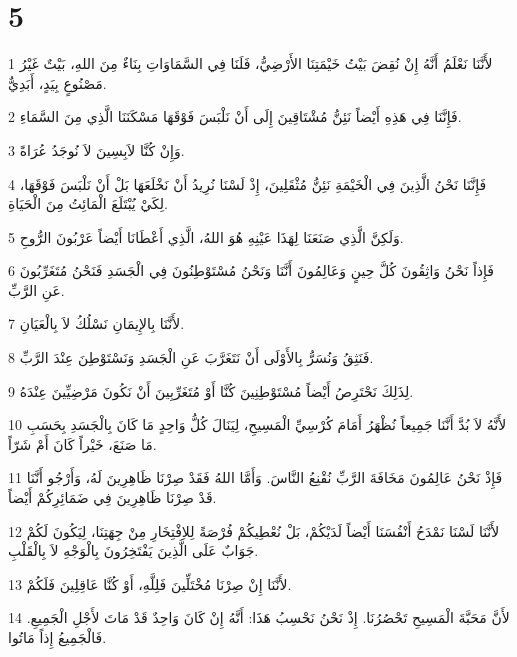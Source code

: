 \chapter{5}

\par 1 لأَنَّنَا نَعْلَمُ أَنَّهُ إِنْ نُقِضَ بَيْتُ خَيْمَتِنَا الأَرْضِيُّ، فَلَنَا فِي السَّمَاوَاتِ بِنَاءٌ مِنَ اللهِ، بَيْتٌ غَيْرُ مَصْنُوعٍ بِيَدٍ، أَبَدِيٌّ.
\par 2 فَإِنَّنَا فِي هَذِهِ أَيْضاً نَئِنُّ مُشْتَاقِينَ إِلَى أَنْ نَلْبَسَ فَوْقَهَا مَسْكَنَنَا الَّذِي مِنَ السَّمَاءِ.
\par 3 وَإِنْ كُنَّا لاَبِسِينَ لاَ نُوجَدُ عُرَاةً.
\par 4 فَإِنَّنَا نَحْنُ الَّذِينَ فِي الْخَيْمَةِ نَئِنُّ مُثْقَلِينَ، إِذْ لَسْنَا نُرِيدُ أَنْ نَخْلَعَهَا بَلْ أَنْ نَلْبَسَ فَوْقَهَا، لِكَيْ يُبْتَلَعَ الْمَائِتُ مِنَ الْحَيَاةِ.
\par 5 وَلَكِنَّ الَّذِي صَنَعَنَا لِهَذَا عَيْنِهِ هُوَ اللهُ، الَّذِي أَعْطَانَا أَيْضاً عَرْبُونَ الرُّوحِ.
\par 6 فَإِذاً نَحْنُ وَاثِقُونَ كُلَّ حِينٍ وَعَالِمُونَ أَنَّنَا وَنَحْنُ مُسْتَوْطِنُونَ فِي الْجَسَدِ فَنَحْنُ مُتَغَرِّبُونَ عَنِ الرَّبِّ.
\par 7 لأَنَّنَا بِالإِيمَانِ نَسْلُكُ لاَ بِالْعَيَانِ.
\par 8 فَنَثِقُ وَنُسَرُّ بِالأَوْلَى أَنْ نَتَغَرَّبَ عَنِ الْجَسَدِ وَنَسْتَوْطِنَ عِنْدَ الرَّبِّ.
\par 9 لِذَلِكَ نَحْتَرِصُ أَيْضاً مُسْتَوْطِنِينَ كُنَّا أَوْ مُتَغَرِّبِينَ أَنْ نَكُونَ مَرْضِيِّينَ عِنْدَهُ.
\par 10 لأَنَّهُ لاَ بُدَّ أَنَّنَا جَمِيعاً نُظْهَرُ أَمَامَ كُرْسِيِّ الْمَسِيحِ، لِيَنَالَ كُلُّ وَاحِدٍ مَا كَانَ بِالْجَسَدِ بِحَسَبِ مَا صَنَعَ، خَيْراً كَانَ أَمْ شَرّاً.
\par 11 فَإِذْ نَحْنُ عَالِمُونَ مَخَافَةَ الرَّبِّ نُقْنِعُ النَّاسَ. وَأَمَّا اللهُ فَقَدْ صِرْنَا ظَاهِرِينَ لَهُ، وَأَرْجُو أَنَّنَا قَدْ صِرْنَا ظَاهِرِينَ فِي ضَمَائِرِكُمْ أَيْضاً.
\par 12 لأَنَّنَا لَسْنَا نَمْدَحُ أَنْفُسَنَا أَيْضاً لَدَيْكُمْ، بَلْ نُعْطِيكُمْ فُرْصَةً لِلاِفْتِخَارِ مِنْ جِهَتِنَا، لِيَكُونَ لَكُمْ جَوَابٌ عَلَى الَّذِينَ يَفْتَخِرُونَ بِالْوَجْهِ لاَ بِالْقَلْبِ.
\par 13 لأَنَّنَا إِنْ صِرْنَا مُخْتَلِّينَ فَلِلَّهِ، أَوْ كُنَّا عَاقِلِينَ فَلَكُمْ.
\par 14 لأَنَّ مَحَبَّةَ الْمَسِيحِ تَحْصُرُنَا. إِذْ نَحْنُ نَحْسِبُ هَذَا: أَنَّهُ إِنْ كَانَ وَاحِدٌ قَدْ مَاتَ لأَجْلِ الْجَمِيعِ. فَالْجَمِيعُ إِذاً مَاتُوا.
